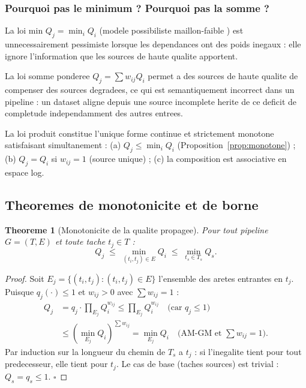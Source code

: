 \documentclass[12pt,a4paper]{article}
\theoremstyle{plain}
\newtheorem{theorem}{Theoreme}[section]
\theoremstyle{definition}
\theoremstyle{remark}
\begin{document}
	\subsubsection{Pourquoi pas le minimum ? Pourquoi pas la somme ?}
	
	La loi min $Q_j = \min_i Q_i$ (modele possibiliste maillon-faible
	\cite{possibility_theory}) est unnecessairement pessimiste lorsque les
	dependances ont des poids inegaux : elle ignore l'information que
	les sources de haute qualite apportent.
	
	La loi somme ponderee $Q_j = \sum w_{ij} Q_i$ permet a des sources de
	haute qualite de compenser des sources degradees, ce qui est
	semantiquement incorrect dans un pipeline : un dataset aligne depuis
	une source incomplete herite de ce deficit de completude
	independamment des autres entrees.
	
	La loi produit constitue l'unique forme continue et strictement
	monotone satisfaisant simultanement :
	(a) $Q_j \leq \min_i Q_i$ (Proposition~\ref{prop:monotone}) ;
	(b) $Q_j = Q_i$ si $w_{ij}=1$ (source unique) ;
	(c) la composition est associative en espace log.
	
	\subsection{Theoremes de monotonicite et de borne}
	
	\begin{theorem}[Monotonicite de la qualite propagee]
		\label{thm:monotone}
		Pour tout pipeline $G=(T,E)$ et toute tache $t_j \in T$ :
		\begin{equation}
			Q_j \;\leq\; \min_{(t_i,t_j)\in E} Q_i
			\;\leq\; \min_{t_s \in T_s} Q_s.
			\label{eq:monotone}
		\end{equation}
	\end{theorem}
	
	\begin{proof}
		Soit $E_j = \{(t_i,t_j) : (t_i,t_j)\in E\}$ l'ensemble des aretes
		entrantes en $t_j$.
		Puisque $q_j(\cdot) \leq 1$ et $w_{ij} > 0$ avec $\sum w_{ij}=1$ :
		\begin{align*}
			Q_j &= q_j \cdot \prod_{E_j} Q_i^{w_{ij}}
			\leq \prod_{E_j} Q_i^{w_{ij}}
			\quad\text{(car } q_j \leq 1\text{)}\\
			&\leq \left(\min_{E_j} Q_i\right)^{\sum w_{ij}}
			= \min_{E_j} Q_i
			\quad\text{(AM-GM et }\textstyle\sum w_{ij}=1\text{)}.
		\end{align*}
		Par induction sur la longueur du chemin de $T_s$ a $t_j$ :
		si l'inegalite tient pour tout predecesseur, elle tient pour $t_j$.
		Le cas de base (taches sources) est trivial : $Q_s = q_s \leq 1$.
		\hfill$\square$
	\end{proof}
	
\end{document}
